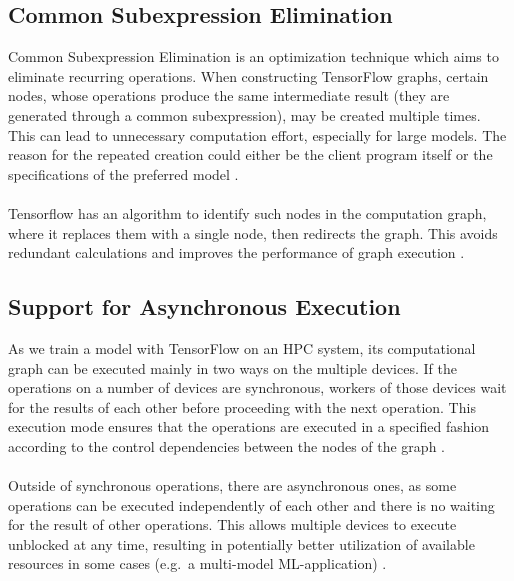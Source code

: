 \documentclass[ieeetran]{article}
\begin{document}
\subsection{Common Subexpression Elimination} %
\label{sub:common_subexpression_elimination}
Common Subexpression Elimination is an optimization technique which aims to eliminate recurring operations. When constructing TensorFlow graphs, certain nodes, whose operations produce the same intermediate result (they are generated through a common subexpression), may be created multiple times. This can lead to unnecessary computation effort, especially for large models. The reason for the repeated creation could either be the client program itself or the specifications of the preferred model \cite{first}.
\\ \\Tensorflow has an algorithm to identify such nodes in the computation graph, where it replaces them with a single node, then redirects the graph. This avoids redundant calculations and improves the performance of graph execution \cite{first}.

\subsection{Support for Asynchronous Execution} %
\label{sub:support_for_asynchronous_kernels}
As we train a model with TensorFlow on an HPC system, its computational graph can be executed mainly in two ways on the multiple devices. If the operations on a number of devices are synchronous, workers of those devices wait for the results of each other before proceeding with the next operation. This execution mode ensures that the operations are executed in a specified fashion according to the control dependencies between the nodes of the graph \cite{first} \cite{fifth}.
\\ \\Outside of synchronous operations, there are asynchronous ones, as some operations can be executed independently of each other and there is no waiting for the result of other operations. This allows multiple devices to execute unblocked at any time, resulting in potentially better utilization of available resources in some cases (e.g.\ a multi-model ML-application) \cite{fifth}.
\end{document}
